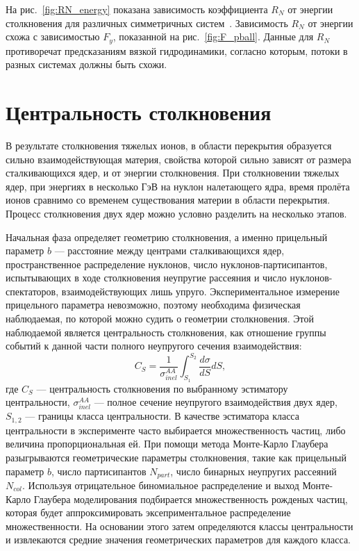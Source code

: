На рис.~\ref{fig:RN_energy} показана зависимость коэффициента $R_N$ от энергии столкновения для различных симметричных систем~\cite{Gustafsson:1984qh}.
Зависимость $R_N$ от энергии схожа с зависимостью $F_y$, показанной на рис.~\ref{fig:F_pball}. 
Данные для $R_N$ противоречат предсказаниям вязкой гидродинамики, согласно которым, потоки в разных системах должны быть схожи.
\section{Центральность столкновения}

В результате столкновения тяжелых ионов, в области перекрытия образуется сильно взаимодействующая материя, свойства которой сильно зависят от размера сталкивающихся ядер, и от энергии столкновения.
При столкновении тяжелых ядер, при энергиях в несколько ГэВ на нуклон налетающего ядра, время пролёта ионов сравнимо со временем существования материи в области перекрытия.
Процесс столкновения двух ядер можно условно разделить на несколько этапов.

Начальная фаза определяет геометрию столкновения, а именно прицельный параметр $b$ --- расстояние между центрами сталкивающихся ядер, пространственное распределение нуклонов, число нуклонов-партисипантов, испытывающих в ходе столкновения неупругие рассеяния и число нуклонов-спектаторов, взаимодействующих лишь упруго.  
Экспериментальное измерение прицельного параметра невозможно, поэтому необходима физическая наблюдаемая, по которой можно судить о геометрии столкновения.
Этой наблюдаемой является центральность столкновения, как отношение группы событий к данной части полного неупругого сечения взаимодействия:
%
\begin{equation}
    C_S = \frac{1}{ \sigma_{inel}^{AA} } \int_{S_1}^{S_2} \frac{d\sigma}{dS}dS,
\end{equation}
где $C_S$ --- центральность столкновения по выбранному эстиматору центральности, $\sigma_{inel}^{AA}$ --- полное сечение неупругого взаимодействия двух ядер, $S_{1,2}$ --- границы класса центральности.
В качестве эстиматора класса центральности в эксперименте часто выбирается множественность частиц, либо величина пропорциональная ей.
При помощи метода Монте-Карло Глаубера разыгрываются геометрические параметры столкновения, такие как прицельный параметр $b$, число партисипантов $N_{part}$, число бинарных неупругих рассеяний $N_{col}$.
Используя отрицательное биномиальное распределение и выход Монте-Карло Глаубера моделирования подбирается множественность рожденых частиц, которая будет аппроксимировать эксеприментальное распределение множественности.
На основании этого затем определяются классы центральности и извлекаются средние значения геометрических параметров для каждого класса.

